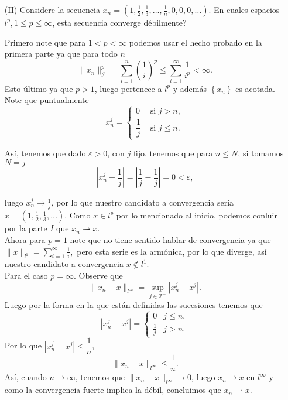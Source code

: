 \begin{itemize}
\begin{sproof}
  \end{sproof}
  \item[(II)]  Considere la secuencia $x_n=\left(1, \frac{1}{2}, \frac{1}{3}, \ldots, \frac{1}{n}, 0,0,0, \ldots\right)$. En cuales espacios $l^p, 1 \leq p \leq \infty$, esta secuencia converge débilmente?
  \begin{sproof}
    Primero note que para $1<p<\infty$ podemos usar el hecho probado en la primera parte ya que para todo $n$
    $$\|x_n\|_{l^p}^p=\sum_{i=1}^n\left(\frac{1}{i}\right)^p\leq\sum_{i=1}^\infty\frac{1}{i^p}<\infty.$$
    Esto último ya que $p>1$, luego pertenece a $l^p$ y además $\left\{x_n\right\}$ es acotada. Note que puntualmente 
    $$x_n^j=\begin{cases}
      0 & \text{ si } j>n,\\
      \dfrac{1}{j} & \text{ si } j\leq n.
    \end{cases}$$

    Así, tenemos que dado $\varepsilon>0$, con $j$ fijo, tenemos que para $n\leq N$, si tomamos $N=j$
    $$\left|x_n^j-\frac{1}{j}\right|=\left|\frac{1}{j}-\frac{1}{j}\right|=0<\varepsilon,$$

    luego $x_n^j\to\frac{1}{j}$, por lo que nuestro candidato a convergencia seria $x=(1,\frac{1}{2},\frac{1}{3},\ldots).$ Como $x\in l^p$ por lo mencionado al inicio, podemos conluir por la parte $I$ que $x_n \rightharpoonup x.$ \\

    Ahora para $p=1$ note que no tiene sentido hablar de convergencia ya que $\|x\|_{l^1}=\displaystyle\sum_{i=1}^\infty\frac{1}{i},$ pero esta serie es la armónica, por lo que diverge, así nuestro candidato a convergencia $x\notin l^1.$\\

    Para el caso $p=\infty.$ Observe que 
    $$\|x_n-x\|_{l^\infty}=\sup_{j\in\mathbb{Z}^+}|x_n^j-x^j|.$$
    Luego por la forma en la que están definidas las sucesiones tenemos que
    $$|x_n^j-x^j|=\begin{cases}
      0& j\leq n,\\
      \frac{1}{j} & j>n.
    \end{cases}$$
      Por lo que $|x_n^j-x^j|\leq \dfrac{1}{n}$,
    $$\|x_n-x\|_{l^\infty}\leq \frac{1}{n}.$$
    Así, cuando $n\to \infty$, tenemos que $\|x_n-x\|_{l^\infty}\to 0$, luego $x_n\to x$ en $l^\infty$ y como la convergencia fuerte implica la débil, concluimos que $x_n \rightharpoonup x.$

    
  \end{sproof}
\end{itemize}



